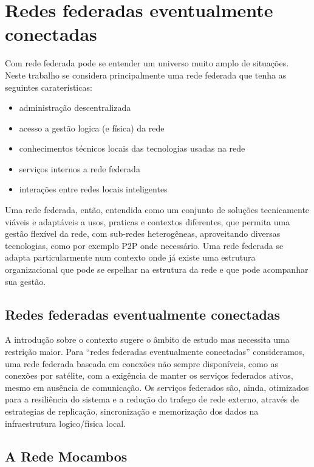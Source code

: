 
\chapter{Redes federadas eventualmente conectadas}
\label{Capitulo2}


Com rede federada pode se entender um universo muito amplo de
situações. Neste trabalho se considera principalmente uma rede
federada que tenha as seguintes caraterísticas:

\begin{itemize}
  \item administração descentralizada
  \item acesso a gestão logica (e física) da rede
  \item conhecimentos técnicos locais das tecnologias usadas na rede
  \item serviços internos a rede federada
  \item interações entre redes locais inteligentes
\end{itemize} 

Uma rede federada, então, entendida como um conjunto de soluções
tecnicamente viáveis e adaptáveis a usos, praticas e contextos
diferentes, que permita uma gestão flexível da rede, com sub-redes
heterogêneas, aproveitando diversas tecnologias, como por exemplo P2P
onde necessário. Uma rede federada se adapta particularmente num
contexto onde já existe uma estrutura organizacional que pode se
espelhar na estrutura da rede e que pode acompanhar sua gestão. 

\section{Redes federadas eventualmente conectadas}
A introdução sobre o contexto sugere o âmbito de estudo mas necessita
uma restrição maior. Para ``redes federadas eventualmente conectadas''
consideramos, uma rede federada baseada em conexões não sempre
disponíveis, como as conexões por satélite, com a exigência de manter
os serviços federados ativos, mesmo em ausência de comunicação. Os
serviços federados são, ainda, otimizados para a resiliência do
sistema e a redução do trafego de rede externo, através de estrategias
de replicação, sincronização e memorização dos dados na infraestrutura
logico/física local.

\section{A Rede Mocambos}   
\label{sec:RedeMocambos}

